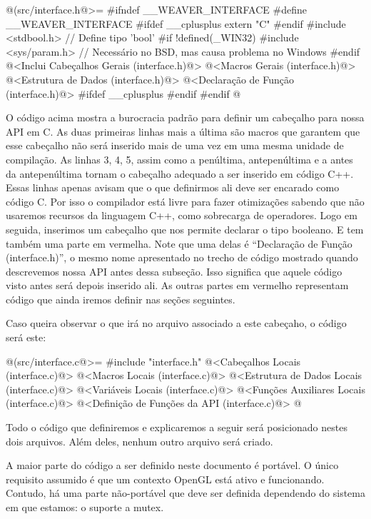 \iniciocodigo
@(src/interface.h@>=
#ifndef __WEAVER_INTERFACE
#define __WEAVER_INTERFACE
#ifdef __cplusplus
extern "C" {
#endif
#include <stdbool.h> // Define tipo 'bool'
#if !defined(_WIN32)
#include <sys/param.h> // Necessário no BSD, mas causa problema no Windows
#endif
@<Inclui Cabeçalhos Gerais (interface.h)@>
@<Macros Gerais (interface.h)@>
@<Estrutura de Dados (interface.h)@>
@<Declaração de Função (interface.h)@>
#ifdef __cplusplus
}
#endif
#endif
@
\fimcodigo

O código acima mostra a burocracia padrão para definir um cabeçalho
para nossa API em C. As duas primeiras linhas mais a última são macros
que garantem que esse cabeçalho não será inserido mais de uma vez em
uma mesma unidade de compilação. As linhas 3, 4, 5, assim como a
penúltima, antepenúltima e a antes da antepenúltima tornam o cabeçalho
adequado a ser inserido em código C++. Essas linhas apenas avisam que
o que definirmos ali deve ser encarado como código C. Por isso o
compilador está livre para fazer otimizações sabendo que não usaremos
recursos da linguagem C++, como sobrecarga de operadores. Logo em
seguida, inserimos um cabeçalho que nos permite declarar o tipo
booleano. E tem também uma parte em vermelha. Note que uma delas é
``Declaração de Função (interface.h)'', o mesmo nome apresentado no trecho de
código mostrado quando descrevemos nossa API antes dessa
subseção. Isso significa que aquele código visto antes será depois
inserido ali. As outras partes em vermelho representam código que
ainda iremos definir nas seções seguintes.

Caso queira observar o que irá no arquivo 
associado a este cabeçaho, o código será este:

\iniciocodigo
@(src/interface.c@>=
#include "interface.h"
@<Cabeçalhos Locais (interface.c)@>
@<Macros Locais (interface.c)@>
@<Estrutura de Dados Locais (interface.c)@>
@<Variáveis Locais (interface.c)@>
@<Funções Auxiliares Locais (interface.c)@>
@<Definição de Funções da API (interface.c)@>
@
\fimcodigo

Todo o código que definiremos e explicaremos a seguir será posicionado
nestes dois arquivos. Além deles, nenhum outro arquivo será criado.


A maior parte do código a ser definido neste documento é portável. O
único requisito assumido é que um contexto OpenGL está ativo e
funcionando. Contudo, há uma parte não-portável que deve ser definida
dependendo do sistema em que estamos: o suporte a mutex.

